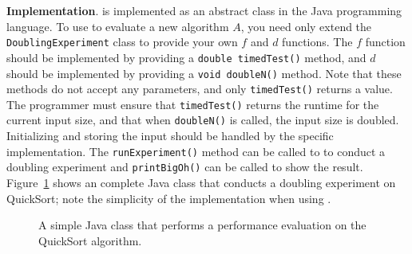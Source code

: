 
    {\bf Implementation}.  \toolname is implemented as an abstract class
    in the Java programming language.  To use \toolname to evaluate a
    new algorithm $A$, you need only extend the
    \texttt{DoublingExperiment} class to provide your own $f$ and $d$
    functions.  The $f$ function should be implemented by providing a
    \texttt{double timedTest()} method, and $d$ should be implemented by
    providing a \texttt{void doubleN()} method. Note that these methods
    do not accept any parameters, and only \texttt{timedTest()} returns
    a value. The programmer must ensure that \texttt{timedTest()}
    returns the runtime for the current input size, and that when
    \texttt{doubleN()} is called, the input size is doubled.
    Initializing and storing the input should be handled by the specific
    implementation. The \texttt{runExperiment()} method can be called to
    to conduct a doubling experiment and \texttt{printBigOh()} can be
    called to show the result. Figure~\ref{fig:qsprogram} shows an
    complete Java class that conducts a doubling experiment on QuickSort;
    note the simplicity of the implementation when using \toolname.



    \begin{figure}[t]
    
    \vspace{-0.15in}
    \caption{A simple Java class that performs a performance evaluation
    on the QuickSort algorithm.}\vspace{-0.20in}
    \label{fig:qsprogram}
    \end{figure}
